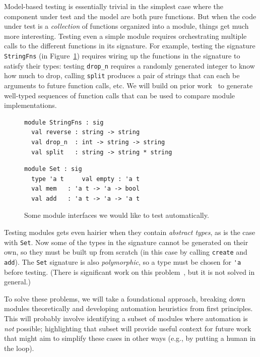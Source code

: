 Model-based testing is essentially trivial in the simplest case where
the component under test and the model are both pure functions.  But
when the code under test is a {\em
  collection} of functions
organized into a module, things get much more interesting. Testing even a simple
module requires orchestrating multiple calls to the different functions in
its signature. For example, testing the signature \lstinline{StringFns} (in
Figure~\ref{fig:sigs}) requires wiring up the functions in the
signature to satisfy their types: testing \lstinline{drop_n} requires a randomly generated
integer to know how much to drop, calling \lstinline{split} produces a pair of strings
that can each be arguments to future function calls, etc. We will build on prior
work~\cite{hughes_experiences_2016} to generate well-typed sequences of function
calls that can be used to compare module implementations.

\begin{figure}[t]
  \begin{minipage}{.45\textwidth}
\begin{lstlisting}
module StringFns : sig
  val reverse : string -> string
  val drop_n  : int -> string -> string
  val split   : string -> string * string
\end{lstlisting}
  \end{minipage}
  \qquad\qquad
  \begin{minipage}{.45\textwidth}
\begin{lstlisting}
module Set : sig
  type 'a t     val empty : 'a t
  val mem   : 'a t -> 'a -> bool
  val add   : 'a t -> 'a -> 'a t
\end{lstlisting}
  \end{minipage}
  \vspace{-2mm}
  \caption{Some module interfaces we would like to test
    automatically.}\label{fig:sigs}
\end{figure}

Testing modules gets even hairier when they contain {\em abstract types}, as is
the case with \lstinline{Set}. Now some of the types in the signature cannot be
generated on their own, so they must be built up from scratch (in this case by
calling \lstinline{create} and \lstinline{add}). The \lstinline{Set} signature is
also {\em polymorphic}, so a type must be chosen for \lstinline{'a} before
testing. (There is significant work on this
problem~\cite{hou_favonia_logarithm_2022}, but it is not solved in general.)

To solve these problems, we will take a foundational approach, breaking down
modules theoretically and developing automation heuristics from first
principles. This will probably involve identifying a subset of
modules where automation is {\em not} possible; highlighting that subset will
provide useful context for future work that might aim to simplify these cases in
other ways (e.g., by putting a human in the loop).

